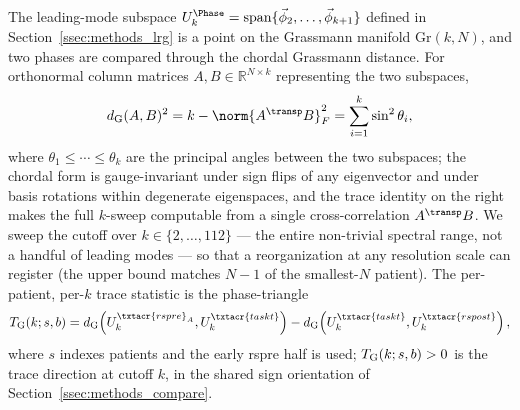 %
The leading-mode subspace \(U^{\Phase}_{k} = \mathrm{span}\{\vec{\phi}_{2}, \ldots, \vec{\phi}_{k+1}\}\) defined in Section~\ref{ssec:methods_lrg} is a point on the Grassmann manifold \(\mathrm{Gr}(k, N)\), and two phases are compared through the chordal Grassmann distance. For orthonormal column matrices \(A, B \in \mathbb{R}^{N \times k}\) representing the two subspaces,
\begin{equation}
    d_{\rm G}(A, B)^{2} = k - \norm{A^{\transp} B}_{F}^{2} = \sum_{i=1}^{k} \sin^{2}\theta_{i},
    \label{eq:methods_grassmann}
\end{equation}
where \(\theta_{1} \le \cdots \le \theta_{k}\) are the principal angles between the two subspaces; the chordal form is gauge-invariant under sign flips of any eigenvector and under basis rotations within degenerate eigenspaces, and the trace identity on the right makes the full \(k\)-sweep computable from a single cross-correlation \(A^{\transp} B\). We sweep the cutoff over \(k \in \{2, \ldots, 112\}\) --- the entire non-trivial spectral range, not a handful of leading modes --- so that a reorganization at any resolution scale can register (the upper bound matches \(N - 1\) of the smallest-\(N\) patient). The per-patient, per-\(k\) trace statistic is the phase-triangle
\begin{equation}
    T_{\rm G}(k; s, b) = d_{\rm G}\!\left(U^{\txtacr{rspre}_{A}}_{k}, U^{\txtacr{taskt}}_{k}\right) - d_{\rm G}\!\left(U^{\txtacr{taskt}}_{k}, U^{\txtacr{rspost}}_{k}\right),
    \label{eq:methods_T_G}
\end{equation}
where \(s\) indexes patients and the early \acrshort{rspre} half is used; \(T_{\rm G}(k; s, b) > 0\) is the trace direction at cutoff \(k\), in the shared sign orientation of Section~\ref{ssec:methods_compare}.

